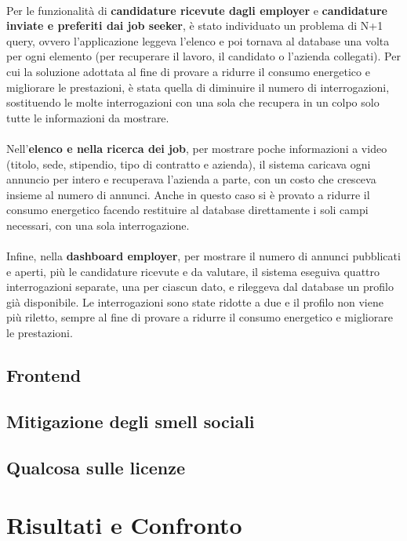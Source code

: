 \documentclass[12pt,a4paper]{article}
\begin{document}
    \paragraph{}
    Per le funzionalità di \textbf{candidature ricevute dagli employer} e \textbf{candidature inviate e preferiti dai job seeker},
    è stato individuato un problema di N+1 query, ovvero l'applicazione leggeva l'elenco e poi tornava al database una
    volta per ogni elemento (per recuperare il lavoro, il candidato o l'azienda collegati).
    Per cui la soluzione adottata al fine di provare a ridurre il consumo energetico e migliorare le prestazioni, è stata quella di
    diminuire il numero di interrogazioni, sostituendo le molte interrogazioni con una sola che recupera in un colpo solo tutte le
    informazioni da mostrare.
    \paragraph{}
    Nell'\textbf{elenco e nella ricerca dei job}, per mostrare poche informazioni a video (titolo, sede,
    stipendio, tipo di contratto e azienda), il sistema caricava ogni annuncio per intero e recuperava l'azienda
    a parte, con un costo che cresceva insieme al numero di annunci. Anche in questo caso si è provato a ridurre
    il consumo energetico facendo restituire al database direttamente i soli campi necessari, con una sola
    interrogazione.
    \paragraph{}
    Infine, nella \textbf{dashboard employer}, per mostrare il numero di annunci pubblicati e aperti, più le
    candidature ricevute e da valutare, il sistema eseguiva quattro interrogazioni separate, una per ciascun dato,
    e rileggeva dal database un profilo già disponibile. Le interrogazioni sono state ridotte a due e il profilo
    non viene più riletto, sempre al fine di provare a ridurre il consumo energetico e migliorare le prestazioni.

    \subsection{Frontend}
    
    
    
    
    \subsection{Mitigazione degli smell sociali}
    
    
    \subsection{Qualcosa sulle licenze}
    
    
    \section{Risultati e Confronto}

    
\end{document}
